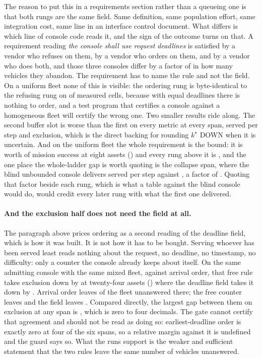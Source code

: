 \documentclass[11pt]{article}
\begin{document}
The reason to put this in a requirements section rather than a queueing one is that both rungs are the same field. Same definition, same population effort, same integration cost, same line in an interface control document. What differs is which line of console code reads it, and the sign of the outcome turns on that. A requirement reading \emph{the console shall use request deadlines} is satisfied by a vendor who refuses on them, by a vendor who orders on them, and by a vendor who does both, and those three consoles differ by a factor of \LdMExclRatio{} in how many vehicles they abandon. The requirement has to name the rule and not the field. On a uniform fleet none of this is visible: the ordering rung is byte-identical to the refusing rung on \LdUEdfSame{} of \LdUEdfCells{} measured cells, because with equal deadlines there is nothing to order, and a test program that certifies a console against a homogeneous fleet will certify the wrong one. Two smaller results ride along. The second buffer slot is worse than the first on every metric at every span, \LdMSrvTwoTwentyFour{} served per step and \LdMStarveTwoTwentyFour{} exclusion, which is the direct backing for rounding $k^{\star}$ DOWN when it is uncertain. And on the uniform fleet the whole requirement is the bound: it is worth \LdUBoundEight{} of mission success at eight assets (\LdUBoundEightV{}) and every rung above it is \LdUFieldEightV{}, and the one place the whole-ladder gap is worth quoting is the collapse span, where the blind unbounded console delivers \LdCollapseBlind{} served per step against \LdCollapseBest{}, a factor of \LdCollapseRatio{}. Quoting that factor beside each rung, which is what a table against the blind console would do, would credit every later rung with what the first one delivered.

\paragraph{And the exclusion half does not need the field at all.} The paragraph above prices ordering as a second reading of the deadline field, which is how it was built. It is not how it has to be bought. Serving whoever has been served least reads nothing about the request, no deadline, no timestamp, no difficulty: only a counter the console already keeps about itself. On the same admitting console with the same mixed fleet, against arrival order, that free rule takes exclusion down by \RnRrExclTwentyFour{} at twenty-four assets (\RnRrExclTwentyFourV{}) where the deadline field takes it down by \RnEdfExclTwentyFour{}. Arrival order leaves \RnLevelFcfs{} of the fleet unanswered there; the free counter leaves \RnLevelRr{} and the field leaves \RnLevelEdf{}. Compared directly, the largest gap between them on exclusion at any span is \RnFreeVsFieldExcl{}, which is zero to four decimals. The gate cannot certify that agreement and should not be read as doing so: earliest-deadline order is exactly zero at four of the six spans, so a relative margin against it is undefined and the guard says so. What the runs support is the weaker and sufficient statement that the two rules leave the same number of vehicles unanswered.
\end{document}

